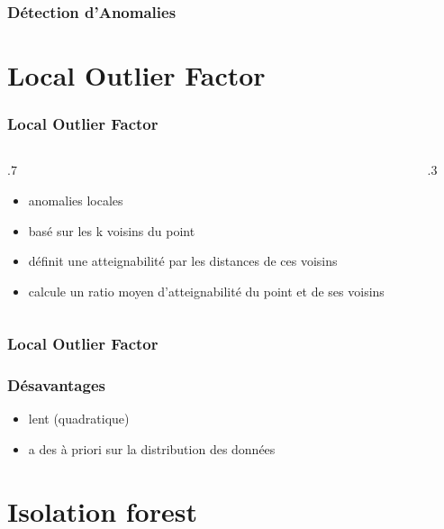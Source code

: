 \documentclass{formation}
\begin{document}
\begin{frame}
  \frametitle{Détection d'Anomalies}
\end{frame}

\section{Local Outlier Factor}

\begin{frame}
  \frametitle{Local Outlier Factor}

  \begin{columns}
    \begin{column}{.7\tw}
      \begin{itemize}[<+->]
      \item anomalies locales
      \item basé sur les k voisins du point
      \item définit une \og atteignabilité\fg{} par les distances de
        ces voisins
      \item calcule un ratio moyen d'atteignabilité du point et de ses
        voisins
      \end{itemize}
    \end{column}
    \begin{column}{.3\tw}
    \end{column}
  \end{columns}
\end{frame}

\begin{frame}
  \frametitle{Local Outlier Factor}
\end{frame}

\begin{frame}
  \frametitle{Désavantages}
  \begin{itemize}
  \item lent (quadratique)
  \item a des à priori sur la distribution des données
  \end{itemize}
\end{frame}

\section{Isolation forest}
\end{document}

